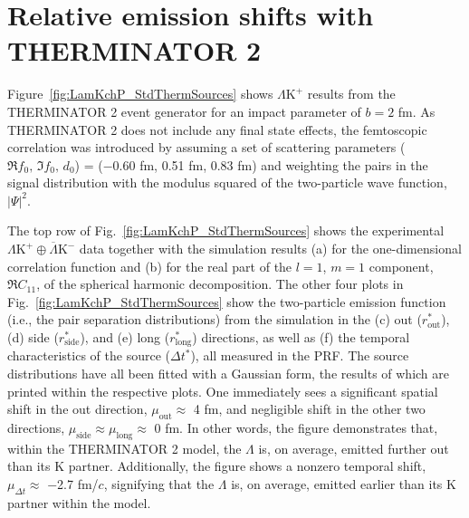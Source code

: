 \documentclass[ALICE,manyauthors]{cernphprep}
\newcommand{\Lam}{$\Lambda$\xspace}
\newcommand{\LamKchP}{$\Lambda\mathrm{K^{+}}$\xspace}
\begin{document}
\section{Relative emission shifts with THERMINATOR 2}
\label{App:THERM}

Figure~\ref{fig:LamKchP_StdThermSources} shows \LamKchP results from the THERMINATOR 2 event generator for an impact parameter of $b = 2$ fm.
As THERMINATOR 2 does not include any final state effects, the femtoscopic correlation was introduced by assuming a set of scattering parameters ($\Re f_{0},\, \Im f_{0},\, d_{0}$) = ($-$0.60 fm, 0.51 fm, 0.83 fm) and weighting the pairs in the signal distribution with the modulus squared of the two-particle wave function, $|\Psi|^{2}$.

The top row of Fig.~\ref{fig:LamKchP_StdThermSources} shows the experimental $\Lambda\mathrm{K}^{+}\oplus\overline{\Lambda}\mathrm{K}^{-}$ data together with the simulation results (a) for the one-dimensional correlation function and (b) for the real part of the $l=1$, $m=1$ component, $\Re C_{11}$, of the spherical harmonic decomposition.
The other four plots in Fig.~\ref{fig:LamKchP_StdThermSources} show the two-particle emission function (i.e., the pair separation distributions) from the simulation in the (c) out ($r^{*}_{\mathrm{out}}$), (d) side ($r^{*}_{\mathrm{side}}$), and (e) long ($r^{*}_{\mathrm{long}}$) directions, as well as (f) the temporal characteristics of the source ($\Delta t^{*}$), all measured in the PRF.
The source distributions have all been fitted with a Gaussian form, the results of which are printed within the respective plots.
One immediately sees a significant spatial shift in the out direction, $\mu_{\mathrm{out}} \approx$ 4 fm, and negligible shift in the other two directions, $\mu_{\mathrm{side}} \approx \mu_{\mathrm{long}} \approx$ 0 fm.
In other words, the figure demonstrates that, within the THERMINATOR 2 model, the \Lam is, on average, emitted further out than its K partner.
Additionally, the figure shows a nonzero temporal shift, $\mu_{\Delta t} \approx$ $-$2.7 fm/$c$, signifying that the \Lam is, on average, emitted earlier than its K partner within the model. 
\end{document}
